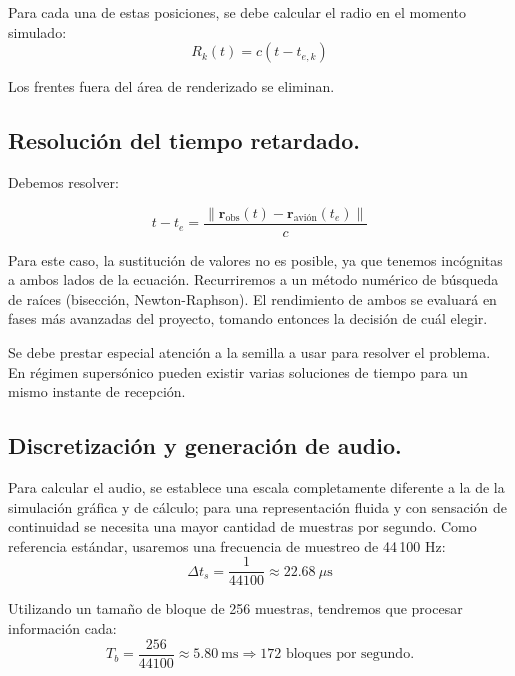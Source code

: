 \documentclass[10.5pt]{article}
\begin{document}
	Para cada una de estas posiciones, se debe calcular el radio en el momento simulado:
	\begin{equation*}
		R_k (t) = c(t - t_{e, k})
	\end{equation*}
	
	Los frentes fuera del área de renderizado se eliminan. 
	
	\subsection{Resolución del tiempo retardado.}
	
	Debemos resolver:
	
	\begin{equation*}
		t - t_e = \frac{\|\mathbf{r}_{\text{obs}}(t) - \mathbf{r}_{\text{avión}}(t_e)\|}{c}
	\end{equation*}
	
	Para este caso, la sustitución de valores no es posible, ya que tenemos incógnitas a ambos lados de la ecuación. Recurriremos a un método numérico de búsqueda de raíces (bisección, Newton-Raphson). El rendimiento de ambos se evaluará en fases más avanzadas del proyecto, tomando entonces la decisión de cuál elegir. 
	
	Se debe prestar especial atención a la semilla a usar para resolver el problema. En régimen supersónico pueden existir varias soluciones de tiempo para un mismo instante de recepción.
	
	\subsection{Discretización y generación de audio.}
	
	Para calcular el audio, se establece una escala completamente diferente a la de la simulación gráfica y de cálculo; para una representación fluida y con sensación de continuidad se necesita una mayor cantidad de muestras por segundo. Como referencia estándar, usaremos una frecuencia de muestreo de 44\,100 Hz:
	\begin{equation*}
		\Delta t_s = \frac{1}{44100} \approx 22.68\ \mu\text{s}
	\end{equation*}
	
	Utilizando un tamaño de bloque de 256 muestras, tendremos que procesar información cada:
	\begin{equation*}
		T_b = \frac{256}{44100} \approx 5.80\ \text{ms} \Rightarrow \text{172 bloques por segundo.}
	\end{equation*}
	
\end{document}
